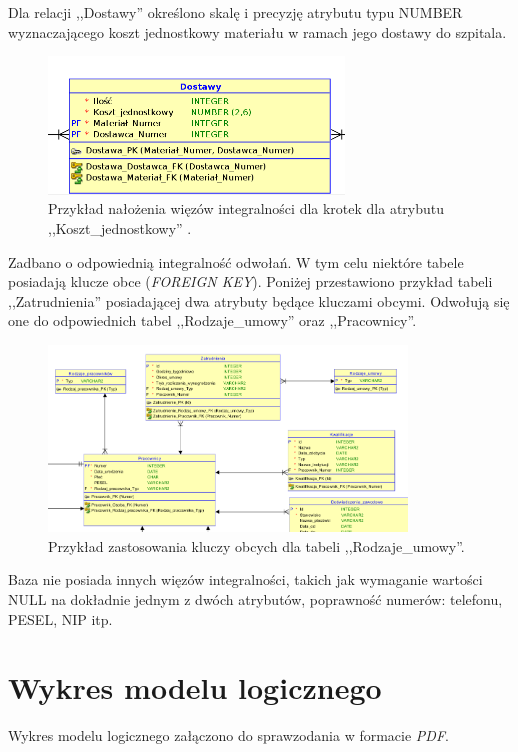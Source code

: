 Dla relacji ,,Dostawy'' określono skalę i precyzję atrybutu typu NUMBER wyznaczającego koszt jednostkowy materiału w ramach jego dostawy do szpitala.

\begin{figure}[H]
\centering
\includegraphics[width=0.7\textwidth]{img/dostawy.png}
\caption{\small Przykład nałożenia więzów integralności dla krotek dla atrybutu ,,Koszt\_jednostkowy'' .}
\end{figure}

\clearpage

Zadbano o odpowiednią integralność odwołań. W tym celu niektóre tabele posiadają klucze obce (\textit{FOREIGN KEY}). Poniżej przestawiono przykład tabeli ,,Zatrudnienia'' posiadającej dwa atrybuty będące kluczami obcymi. Odwołują się one do odpowiednich tabel ,,Rodzaje\_umowy'' oraz ,,Pracownicy''.

\begin{figure}[H]
\centering
\includegraphics[width=0.85\textwidth]{img/itegralnosc_odwolan.png}
\caption{\small Przykład zastosowania kluczy obcych dla tabeli ,,Rodzaje\_umowy''.}
\end{figure}

Baza nie posiada innych więzów integralności, takich jak wymaganie wartości NULL na dokładnie jednym z dwóch atrybutów, poprawność numerów: telefonu, PESEL, NIP itp.



\section{Wykres modelu logicznego}
Wykres modelu logicznego załączono do sprawzodania w formacie \textit{PDF}.

